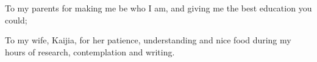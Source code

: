
\cleardoublepage


\begin{dedication}

To my parents for making me be who I am, and giving me the best education you could;

To my wife, Kaijia, for her patience, understanding and nice food during my hours of research, contemplation and writing.

\end{dedication}
